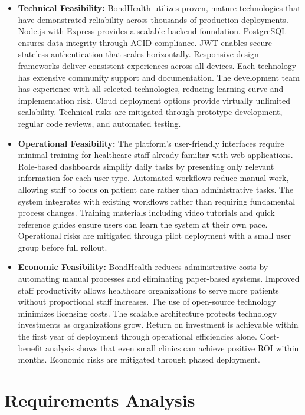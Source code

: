 \begin{itemize}
    \item \textbf{Technical Feasibility:} BondHealth utilizes proven, mature technologies that have demonstrated reliability across thousands of production deployments. Node.js with Express provides a scalable backend foundation. PostgreSQL ensures data integrity through ACID compliance. JWT enables secure stateless authentication that scales horizontally. Responsive design frameworks deliver consistent experiences across all devices. Each technology has extensive community support and documentation. The development team has experience with all selected technologies, reducing learning curve and implementation risk. Cloud deployment options provide virtually unlimited scalability. Technical risks are mitigated through prototype development, regular code reviews, and automated testing.

    \item \textbf{Operational Feasibility:} The platform's user-friendly interfaces require minimal training for healthcare staff already familiar with web applications. Role-based dashboards simplify daily tasks by presenting only relevant information for each user type. Automated workflows reduce manual work, allowing staff to focus on patient care rather than administrative tasks. The system integrates with existing workflows rather than requiring fundamental process changes. Training materials including video tutorials and quick reference guides ensure users can learn the system at their own pace. Operational risks are mitigated through pilot deployment with a small user group before full rollout.

    \item \textbf{Economic Feasibility:} BondHealth reduces administrative costs by automating manual processes and eliminating paper-based systems. Improved staff productivity allows healthcare organizations to serve more patients without proportional staff increases. The use of open-source technology minimizes licensing costs. The scalable architecture protects technology investments as organizations grow. Return on investment is achievable within the first year of deployment through operational efficiencies alone. Cost-benefit analysis shows that even small clinics can achieve positive ROI within months. Economic risks are mitigated through phased deployment.
\end{itemize}

\section{Requirements Analysis}

